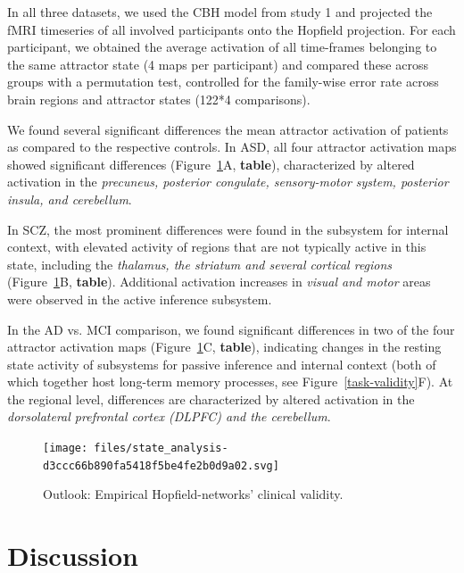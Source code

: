 \documentclass{article}
\begin{document}
In all three datasets, we used the CBH model from study 1 and projected the fMRI timeseries of all involved participants onto the Hopfield projection. For each participant, we obtained the average activation of all time-frames belonging to the same attractor state (4 maps per participant) and compared these across groups with a permutation test, controlled for the family-wise error rate across brain regions and attractor states (122*4 comparisons).

We found several significant differences the mean attractor activation of patients as compared to the respective controls. In ASD, all four attractor activation maps showed significant differences (Figure~\ref{clinical-validity}A, \textbf{table}), characterized by altered activation in the \textit{precuneus, posterior congulate, sensory-motor system, posterior insula, and cerebellum}.

In SCZ, the most prominent differences were found in the subsystem for internal context, with elevated activity of regions that are not typically active in this state, including the \textit{thalamus, the striatum and several cortical regions} (Figure~\ref{clinical-validity}B, \textbf{table}). Additional activation increases in \textit{visual and motor} areas were observed in the active inference subsystem.

In the AD vs. MCI comparison, we found significant differences in two of the four attractor activation maps (Figure~\ref{clinical-validity}C, \textbf{table}), indicating changes in the resting state activity of subsystems for passive inference and internal context (both of which together host long-term memory processes, see Figure~\ref{task-validity}F). At the regional level, differences are characterized by altered activation in the \textit{dorsolateral prefrontal cortex (DLPFC) and the cerebellum}.

\begin{figure}[!htbp]
\centering
\texttt{[image: files/state\_analysis-d3ccc66b890fa5418f5be4fe2b0d9a02.svg]}
\caption[]{Outlook: Empirical Hopfield-networks' clinical validity.}
\label{clinical-validity}
\end{figure}

\section{Discussion}\label{Discussion}
\end{document}
